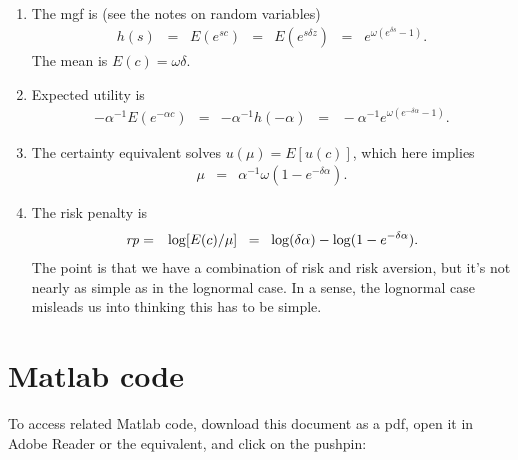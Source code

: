 \documentclass[11pt]{article}
\begin{document}
\begin{enumerate}
\begin{enumerate}
\item The mgf is (see the notes on random variables)
\begin{eqnarray*}
    h(s) \;\;=\;\;  E(e^{sc}) &=& E(e^{s\delta z}) \;\;=\;\;  e^{\omega (e^{\delta s} -1)} .
\end{eqnarray*}
The mean is $ E(c) = \omega\delta $.

\item Expected utility is
\begin{eqnarray*}
 - \alpha^{-1} E(e^{-\alpha c}) &=& - \alpha^{-1} h(-\alpha)
            \;\;=\;\; - \alpha^{-1} e^{\omega (e^{-\delta\alpha } -1)} .
\end{eqnarray*}

\item The certainty equivalent solves $u(\mu) = E[u(c)]$, which here implies
\begin{eqnarray*}
    \mu &=& \alpha^{-1} \omega (1- e^{-\delta \alpha}) .
\end{eqnarray*}

\item The risk penalty is
\begin{eqnarray*}
    \mbox{\em rp\/} &=& \log [E(c)/\mu]
            \;\;=\;\; \log (\delta \alpha) - \log (1- e^{-\delta \alpha}) .
\end{eqnarray*}
The point is that we have a combination of risk and risk aversion,
but it's not nearly as simple as in the lognormal case.
In a sense, the lognormal case misleads us into thinking this has to be simple.
\end{enumerate}


\end{enumerate}


\section*{Matlab code}

To access related Matlab code, download this document as a pdf, open it in Adobe Reader or the equivalent, and click on the pushpin:




\end{document}
